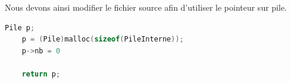 Nous devons ainsi modifier le fichier source afin d'utiliser le pointeur sur pile.
\begin{lstlisting}[language=C, numbers=none,caption=Modification de la fonction \texttt{creer} s'adaptant à la protection de données]
	Pile p;
	p = (Pile)malloc(sizeof(PileInterne));
	p->nb = 0

	return p;
\end{lstlisting}

